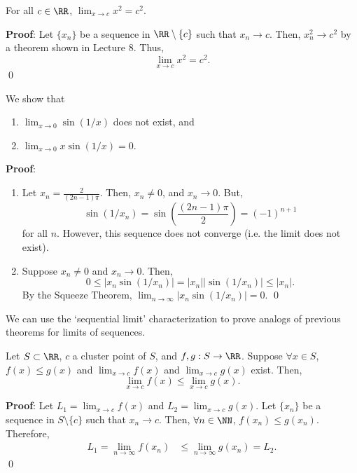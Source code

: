 
\begin{theorem}
For all $c\in \RR$, $\lim_{x\to c} x^2 = c^2$.
\end{theorem}
\textbf{Proof}: Let $\{x_n\}$ be a sequence in $\RR\setminus \{c\}$ such that $x_n\to c$. Then, $x_n^2 \to c^2$ by a theorem shown in Lecture 8. Thus, 
\[
\lim_{x\to c}x^2 = c^2.
\]
\qed 

\begin{theorem}
We show that
\begin{enumerate}
    \item $\lim_{x\to 0} \sin(1/x)$ does not exist, and 
    \item $\lim_{x\to 0} x\sin(1/x) = 0$.
\end{enumerate}
\end{theorem}
\textbf{Proof}:
\begin{enumerate}
    \item Let $x_n = \frac{2}{(2n-1) \pi}$. Then, $x_n\neq 0$, and $x_n\to 0$. But, 
\[
\sin(1/x_n) = \sin \left(\frac{(2n-1)\pi}{2}\right) = (-1)^{n+1}
\]
for all $n.$ However, this sequence does not converge (i.e. the limit does not exist).
\item Suppose $x_n\neq 0$ and $x_n\to 0$. Then, 
\[
0\leq |x_n\sin(1/x_n)| = |x_n||\sin(1/x_n)|\leq |x_n|.
\]
By the Squeeze Theorem, $\lim_{n\to \infty} |x_n\sin(1/x_n)| = 0$. \qed 
\end{enumerate}
We can use the `sequential limit' characterization to prove analogs of previous theorems for limits of sequences.
\begin{theorem}
Let $S\subset \RR$, $c$ a cluster point of $S$, and $f,g:S\to \RR$. Suppose $\forall x\in S$, $f(x) \leq g(x)$ and $\lim_{x\to c} f(x)$ and $\lim_{x\to c} g(x)$ exist. Then, 
\[
\lim_{x\to c} f(x)\leq \lim_{x\to c} g(x).
\]
\end{theorem}%
\textbf{Proof}: Let $L_1 = \lim_{x\to c} f(x)$ and $L_2 = \lim_{x\to c} g(x)$. Let $\{x_n\}$ be a sequence in $S\setminus \{c\}$ such that $x_n\to c$. Then, $\forall n\in \NN$, $f(x_n) \leq g(x_n)$. Therefore, 
\begin{align*}
    L_1 = \lim_{n\to \infty} f(x_n) &\leq \lim_{n\to \infty} g(x_n) = L_2. 
\end{align*}
\qed 


